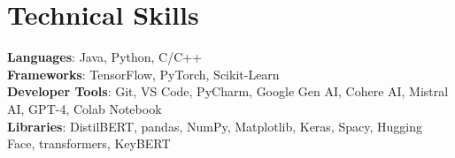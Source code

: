 \documentclass[letterpaper,11pt]{article}
\begin{document}
\section{Technical Skills}
 \begin{itemize}[leftmargin=0.15in, label={}]
    \small{\item{
     \textbf{Languages}{: Java, Python, C/C++} \\
     \textbf{Frameworks}{: TensorFlow, PyTorch, Scikit-Learn} \\
     \textbf{Developer Tools}{: Git, VS Code, PyCharm, Google Gen AI, Cohere AI, Mistral AI, GPT-4, Colab Notebook} \\
     \textbf{Libraries}{: DistilBERT, pandas, NumPy, Matplotlib, Keras, Spacy, Hugging Face, transformers, KeyBERT}
    }}
 \end{itemize}

\end{document}
